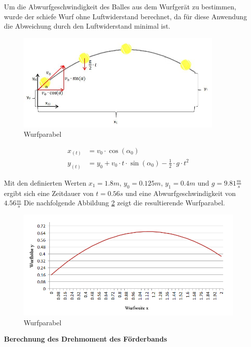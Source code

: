 Um die Abwurfgeschwindigkeit des Balles aus dem Wurfgerät zu bestimmen, wurde der schiefe
Wurf ohne Luftwiderstand berechnet, da für diese Anwendung die Abweichung durch den
Luftwiderstand minimal ist.
\begin{figure}[h!]
	\centering
	\includegraphics[width=0.9\textwidth]{Enddokumentation/Anhang/Bilder/Schiefer_Wurf2.jpg}
	\caption{Wurfparabel}
	\label{fig:Wurfparabel}
\end{figure}
\begin{align}
	x_{(t)} &= v_0 \cdot \cos(\alpha_0)\\
	y_{(t)} &= y_0 + v_0 \cdot t \cdot \sin(\alpha_0) - \frac{1}{2} \cdot g \cdot t^2
\end{align}

Mit den definierten Werten $x_1 = 1.8 m$, $y_0 = 0.125 m$, $y_1 = 0.4 m$ und 
$g = 9.81 \frac{m}{s}$ ergibt sich eine Zeitdauer von $t = 0.56 s$ und eine
Abwurfgeschwindigkeit von $4.56 \frac{m}{s}$ Die nachfolgende Abbildung
\ref{fig:Wurfparabel1} zeigt die resultierende Wurfparabel.
\begin{figure}[h!]
	\centering
	\includegraphics[width=1\textwidth]{Enddokumentation/Anhang/Bilder/Schiefer_Wurf.jpg}
	\caption{Wurfparabel}
	\label{fig:Wurfparabel1}
\end{figure}

\textbf{Berechnung des Drehmoment des Förderbands}\\

